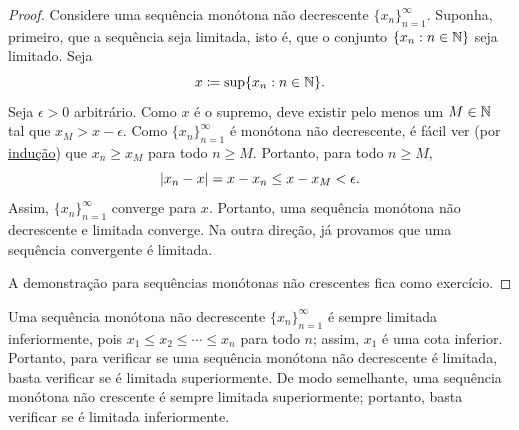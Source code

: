 \begin{proof}
Considere uma sequência monótona não decrescente
$\{ x_n \}_{n=1}^\infty$. Suponha, primeiro, que a sequência seja limitada,
isto é, que o conjunto $\{ x_n : n \in {\mathbb{N}} \}$ seja limitado. Seja
\begin{equation*}
x \coloneqq \sup \{ x_n : n \in {\mathbb{N}} \} .
\end{equation*}
Seja $\epsilon > 0$ arbitrário. Como $x$ é o supremo, deve existir pelo
menos um $M \in {\mathbb{N}}$ tal que $x_{M} > x-\epsilon$.
Como $\{ x_n \}_{n=1}^\infty$ é monótona não decrescente, é fácil ver
(por \hyperref[induction:thm]{indução}) que $x_n \geq x_{M}$ para todo
$n \geq M$. Portanto, para todo $n \geq M$,
\begin{equation*}
\lvert {x_n-x} \rvert = x-x_n \leq x-x_{M} < \epsilon  .
\end{equation*}
Assim, $\{ x_n \}_{n=1}^\infty$ converge para $x$.
Portanto, uma sequência monótona não decrescente e limitada converge.
Na outra direção, já provamos que uma sequência convergente é limitada.

A demonstração para sequências monótonas não crescentes fica como exercício.
\end{proof}

Uma sequência monótona não decrescente $\{ x_n \}_{n=1}^\infty$ é sempre
limitada inferiormente, pois $x_1 \leq x_2 \leq \cdots \leq x_n$ para todo
$n$; assim, $x_1$ é uma cota inferior. Portanto, para verificar se uma
sequência monótona não decrescente é limitada, basta verificar se é limitada
superiormente. De modo semelhante, uma sequência monótona não crescente é
sempre limitada superiormente; portanto, basta verificar se é limitada
inferiormente.

